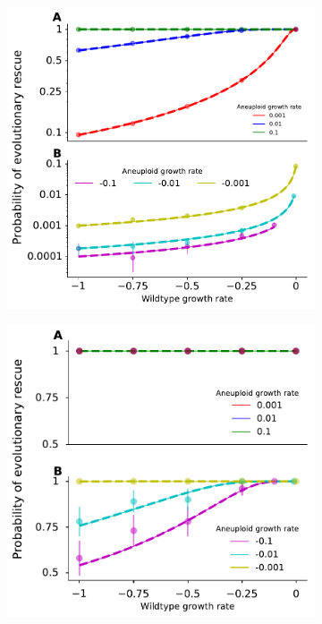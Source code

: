 \documentclass[12pt]{extarticle}
\begin{document}
\newpage
\nolinenumbers
%


\newpage

\begin{figure}[p]
\begin{subfigure}{0.5\textwidth}
\includegraphics[width=1\textwidth]{Figures/CombinedSubplot.pdf}
\end{subfigure}
\begin{subfigure}{0.5\textwidth}
\includegraphics[width=1\textwidth]{Figures/CombinedSubplotLargePop.pdf}

\end{subfigure}
\end{figure}
\end{document}
